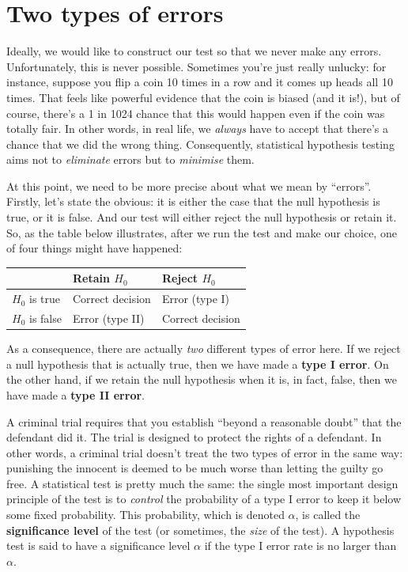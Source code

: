 \documentclass[
]{book}
\theoremstyle{definition}
\theoremstyle{definition}
\theoremstyle{definition}
\theoremstyle{definition}
\theoremstyle{remark}
\begin{document}
\hypertarget{errortypes}{%
\section{Two types of errors}\label{errortypes}}

Ideally, we would like to construct our test so that we never make any errors. Unfortunately, this is never possible. Sometimes you're just really unlucky: for instance, suppose you flip a coin 10 times in a row and it comes up heads all 10 times. That feels like powerful evidence that the coin is biased (and it is!), but of course, there's a 1 in 1024 chance that this would happen even if the coin was totally fair. In other words, in real life, we \emph{always} have to accept that there's a chance that we did the wrong thing. Consequently, statistical hypothesis testing aims not to \emph{eliminate} errors but to \emph{minimise} them.

At this point, we need to be more precise about what we mean by ``errors''. Firstly, let's state the obvious: it is either the case that the null hypothesis is true, or it is false. And our test will either reject the null hypothesis or retain it. So, as the table below illustrates, after we run the test and make our choice, one of four things might have happened:

\begin{longtable}[]{@{}lll@{}}
\toprule()
& Retain \(H_0\) & Reject \(H_0\) \\
\midrule()
\endhead
\(H_0\) is true & Correct decision & Error (type I) \\
\(H_0\) is false & Error (type II) & Correct decision \\
\bottomrule()
\end{longtable}

As a consequence, there are actually \emph{two} different types of error here. If we reject a null hypothesis that is actually true, then we have made a \textbf{type I error}. On the other hand, if we retain the null hypothesis when it is, in fact, false, then we have made a \textbf{type II error}.

A criminal trial requires that you establish ``beyond a reasonable doubt'' that the defendant did it. The trial is designed to protect the rights of a defendant. In other words, a criminal trial doesn't treat the two types of error in the same way: punishing the innocent is deemed to be much worse than letting the guilty go free. A statistical test is pretty much the same: the single most important design principle of the test is to \emph{control} the probability of a type I error to keep it below some fixed probability. This probability, which is denoted \(\alpha\), is called the \textbf{significance level} of the test (or sometimes, the \emph{size} of the test). A hypothesis test is said to have a significance level \(\alpha\) if the type I error rate is no larger than \(\alpha\).
\end{document}
